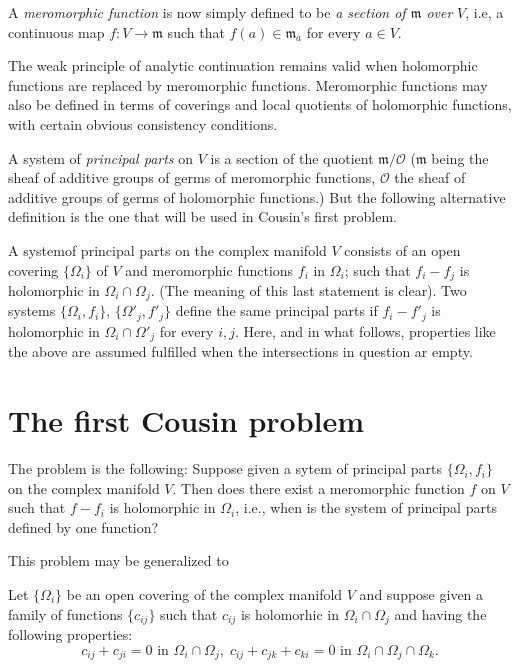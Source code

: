 A \textit{meromorphic function} is now simply defined to be \textit{a
  section of $\mathfrak{m}$ over} $V$, i.e, a continuous map $f: V
\to \mathfrak{m}$ such that $f(a) \in \mathfrak{m}_a$ for every $a \in
V$. 

The weak principle of analytic continuation remains valid when
holomorphic functions are replaced by meromorphic
functions. Meromorphic functions may also be defined in terms of
coverings and local quotients of holomorphic functions, with certain
obvious consistency conditions. 

\medskip
{}

A system of \textit{principal parts} on $V$ is a section of the
quotient $\mathfrak{m}/\mathscr{O}$ ($\mathfrak{m}$ being the sheaf of
additive groups of germs of meromorphic functions, $\mathscr{O}$ the
sheaf of additive groups of germs of holomorphic functions.) But the
following alternative definition is the one that will be used in
Cousin's first problem.

A system\pageoriginale of principal parts on the complex manifold $V$
consists of an open covering $\{\Omega_i\}$ of $V$ and meromorphic
functions $f_i$ in $\Omega_i$; such that $f_i - f_j$ is holomorphic in
$\Omega_i \cap \Omega_j$. (The meaning of this last statement is
clear). Two systems $\{\Omega_i, f_i\}$, $\{\Omega'_j, f'_j\}$ define
the same principal parts if $f_i - f'_j$ is holomorphic in $\Omega_i
\cap \Omega'_j$ for every $i,j$. Here, and in what follows, properties
like the above are assumed fulfilled when the intersections in
question ar empty.

\section{The first Cousin problem}\label{chap8:sec5}

The problem is the following: Suppose given a sytem of principal parts
$\{\Omega_i, f_i \}$ on the complex manifold $V$. Then does there
exist a meromorphic function $f$ on $V$ such that $f-f_i$ is
holomorphic in $\Omega_i$, i.e., when is the system of principal parts
defined by one function?

This problem may be generalized to 


\medskip
{}

Let $\{\Omega_i\}$ be an open covering of the complex manifold $V$ and
suppose given a family of functions $\{c_{ij}\}$ such that $c_{ij}$ is
holomorhic in $\Omega_i \cap \Omega_j$ and having the following
properties:
\begin{equation*}
c_{ij} + c_{ji}  = 0 \text{ in } \Omega_{i} \cap \Omega_j, \;
c_{ij} + c_{jk} + c_{ki} = 0 \text{ in } \Omega_i \cap \Omega_j \cap
\Omega_k. 
\end{equation*}

